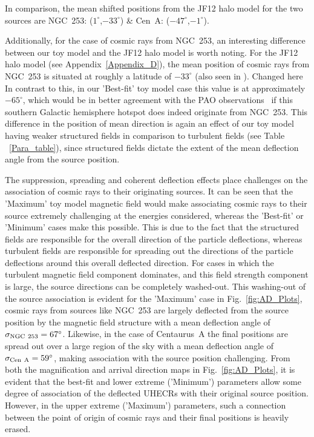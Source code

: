 \documentclass[usenatbib]{mnras}
\newcommand{\Vasu}[1]{{\color{purple}#1}}
\begin{document}
In comparison, the mean shifted positions from the JF12 halo model for the two sources are  NGC~253: ($1^{\circ}$,$-33^{\circ}$) \& Cen~A: ($-47^{\circ}$,$-1^{\circ}$).

Additionally, for the case of cosmic rays from NGC~253, an interesting difference between our toy model and the JF12 halo model is worth noting. For the JF12 halo model (see Appendix~\ref{Appendix_D}), the mean position of cosmic rays from NGC~253 is situated at roughly a latitude of $-33^{\circ}$ (also seen in \citet{Arjen_2021}). \Vasu{Changed here} In contrast to this, in our 'Best-fit' toy model case this value is at approximately $-65^{\circ}$, which would be in better agreement with the PAO observations~\citep{Auger_Starburst2018} if this southern Galactic hemisphere hotspot does indeed originate from NGC~253. This difference in the position of mean direction is again an effect of our toy model having weaker structured fields in comparison to turbulent fields (see Table ~\ref{Para_table}), since structured fields dictate the extent of the mean deflection angle from the source position. 

The suppression, spreading and coherent deflection effects place challenges on the association of cosmic rays to their originating sources. It can be seen that the 'Maximum' toy model magnetic field would make associating cosmic rays to their source extremely challenging at the energies considered, whereas the 'Best-fit' or 'Minimum' cases make this possible. This is due to the fact that the structured fields are responsible for the overall direction of the particle deflections, whereas turbulent fields are responsible for spreading out the directions of the particle deflections around this overall deflected direction. For cases in which the turbulent magnetic field component dominates, and this field strength component is large, the source directions can be completely washed-out. This washing-out of the source association is evident for the 'Maximum' case in Fig.~\ref{fig:AD_Plots}, cosmic rays from sources like NGC~253 are largely deflected from the source position by the magnetic field structure with a mean deflection angle of $\sigma_{\rm NGC~253} = 67^{\circ}$. Likewise, in the case of Centaurus~A the final positions are spread out over a large region of the sky with a mean deflection angle of $\sigma_{\rm Cen~A} = 59^{\circ}$, making association with the source position challenging. From both the magnification and arrival direction maps in Fig.~\ref{fig:AD_Plots}, it is evident that the best-fit and lower extreme ('Minimum') parameters allow some degree of association of the deflected UHECRs with their original source position. However, in the upper extreme ('Maximum') parameters, such a connection between the point of origin of cosmic rays and their final positions is heavily erased. 
\end{document}
